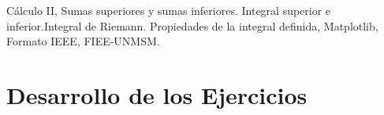 \documentclass[conference]{IEEEtran}
\newcommand{\TemaSemana}{Sumas superiores y sumas inferiores. Integral superior e inferior.Integral de Riemann. Propiedades de la integral definida}
\begin{document}
	\begin{IEEEkeywords}
		Cálculo II, \TemaSemana, Matplotlib, Formato IEEE, FIEE-UNMSM.
	\end{IEEEkeywords}
	
	\section{Desarrollo de los Ejercicios}
	
	
	
	
	
	
	
	
	
	
	
	
	
	
	
	
	
	
	
\end{document}

